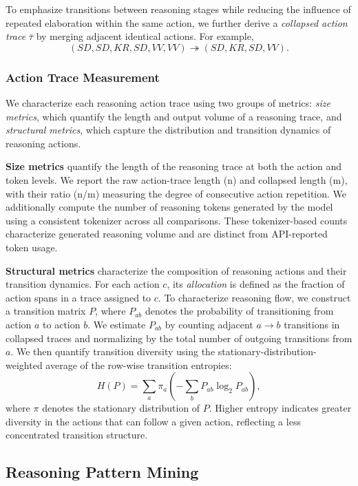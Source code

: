 \documentclass[acmsmall,screen,review,anonymous]{acmart}
\begin{document}
To emphasize transitions between reasoning stages while reducing the influence of repeated elaboration within the same action, we further derive a \textit{collapsed action trace} $\bar{\tau}$ by merging adjacent identical actions. For example,
\[
(SD,SD,KR,SD,VV,VV)
\twoheadrightarrow
(SD,KR,SD,VV).
\]

\subsubsection{\textbf{Action Trace Measurement}}
\label{sec:structural-metrics}
We characterize each reasoning action trace using two groups of metrics: \emph{size metrics}, which quantify the length and output volume of a reasoning trace, and \emph{structural metrics}, which capture the distribution and transition dynamics of reasoning actions.

\textbf{Size metrics} quantify the length of the reasoning trace at both the action and token levels. We report the raw action-trace length (n) and collapsed length (m), with their ratio (n/m) measuring the degree of consecutive action repetition. We additionally compute the number of reasoning tokens generated by the model using a consistent tokenizer across all comparisons. These tokenizer-based counts characterize generated reasoning volume and are distinct from API-reported token usage.

\textbf{Structural metrics} characterize the composition of reasoning actions and their transition dynamics. For each action \(c\), its \emph{allocation} is defined as the fraction of action spans in a trace assigned to \(c\). To characterize reasoning flow, we construct a transition matrix \(P\), where \(P_{ab}\) denotes the probability of transitioning from action \(a\) to action \(b\). We estimate \(P_{ab}\) by counting adjacent \(a\rightarrow b\) transitions in collapsed traces and normalizing by the total number of outgoing transitions from \(a\). We then quantify transition diversity using the stationary-distribution-weighted average of the row-wise transition entropies:
\begin{equation}
H(P)=\sum_{a}\pi_a\left(-\sum_{b}P_{ab}\log_2P_{ab}\right),
\end{equation}
where \(\pi\) denotes the stationary distribution of \(P\). Higher entropy indicates greater diversity in the actions that can follow a given action, reflecting a less concentrated transition structure.


\subsection{Reasoning Pattern Mining}
\label{sec:pattern-mining}
\end{document}
